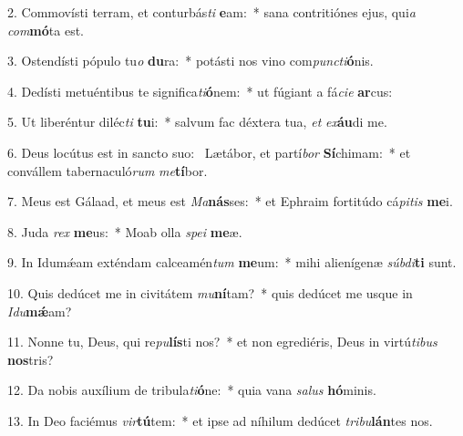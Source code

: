 2. Commovísti terram, et conturbás\textit{ti} \textbf{e}am:~*  sana contritiónes ejus, qui\textit{a} \textit{com}\textbf{mó}ta est.\

3. Ostendísti pópulo tu\textit{o} \textbf{du}ra:~*  potásti nos vino com\textit{punc}\textit{ti}\textbf{ó}nis.\

4. Dedísti metuéntibus te significa\textit{ti}\textbf{ó}nem:~*  ut fúgiant a fá\textit{ci}\textit{e} \textbf{ar}cus:\

5. Ut liberéntur diléc\textit{ti} \textbf{tu}i:~*  salvum fac déxtera tua, \textit{et} \textit{ex}\textbf{áu}di me.\

6. Deus locútus est in sancto suo: \dag\  Lætábor, et partí\textit{bor} \textbf{Sí}chimam:~*  et convállem tabernaculó\textit{rum} \textit{me}\textbf{tí}bor.\

7. Meus est Gálaad, et meus est \textit{Ma}\textbf{nás}ses:~*  et Ephraim fortitúdo cá\textit{pi}\textit{tis} \textbf{me}i.\

8. Juda \textit{rex} \textbf{me}us:~*  Moab olla \textit{spe}\textit{i} \textbf{me}æ.\

9. In Idumǽam exténdam calceamén\textit{tum} \textbf{me}um:~*  mihi alienígenæ \textit{súb}\textit{di}\textbf{ti} sunt.\

10. Quis dedúcet me in civitátem \textit{mu}\textbf{ní}tam?~*  quis dedúcet me usque in \textit{I}\textit{du}\textbf{mǽ}am?\

11. Nonne tu, Deus, qui re\textit{pu}\textbf{lís}ti nos?~*  et non egrediéris, Deus in virtú\textit{ti}\textit{bus} \textbf{nos}tris?\

12. Da nobis auxílium de tribula\textit{ti}\textbf{ó}ne:~*  quia vana \textit{sa}\textit{lus} \textbf{hó}minis.\

13. In Deo faciémus \textit{vir}\textbf{tú}tem:~*  et ipse ad níhilum dedúcet \textit{tri}\textit{bu}\textbf{lán}tes nos.\

